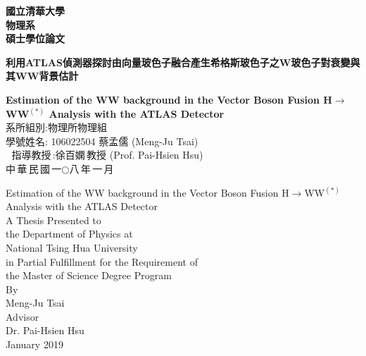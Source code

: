 \begin{titlepage}  %
\begin{center}
\Huge
\textbf{國立清華大學\\物理系\\碩士學位論文\\}
\vspace*{1.5in}
\huge
	
\textbf{利用ATLAS偵測器探討由向量玻色子融合產生希格斯玻色子之W玻色子對衰變與其WW背景估計}
	
\LARGE
\textbf{Estimation of the WW background in the Vector Boson Fusion H$\rightarrow$WW$^{(*)}$ Analysis with the ATLAS
Detector\\}
\vfill
\Large 系所組別:物理所物理組\\
\Large 學號姓名: 106022504 蔡孟儒 (Meng-Ju Tsai)\\
\Large $\:$$\:$$\,$指導教授$\,$:徐百嫻$\,$教授 (Prof. Pai-Hsien Hsu)$\:$\\ 
\vfill
\Large 中$\,$華$\,$民$\,$國$\,$一$\bigcirc$八$\,$年$\,$一$\,$月
\end{center}
\end{titlepage}

\begin{titlepage} %
\begin{center}
\huge {Estimation of the WW background in the Vector Boson Fusion H$\rightarrow$WW$^{(*)}$ Analysis with the ATLAS
	Detector\\}
\vspace*{1.5in}
\large A Thesis Presented to \\the Department of Physics at \\National Tsing Hua University \\in Partial Fulfillment for the Requirement of \\the Master of Science Degree Program\\
\vspace*{2in}
\large By\\Meng-Ju Tsai\\
\large Advisor\\Dr. Pai-Hsien Hsu\\
\large January 2019
\end{center}
\end{titlepage}
